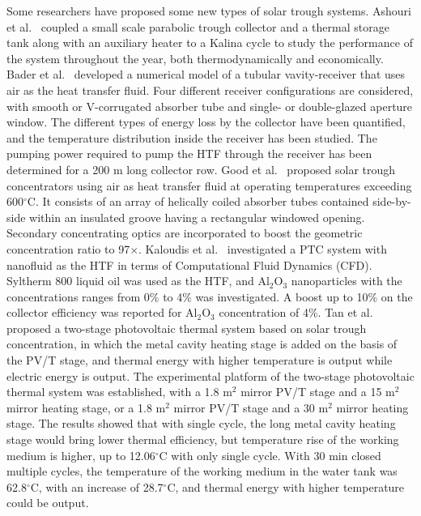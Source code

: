 Some researchers have proposed some new types of solar trough systems.
Ashouri et al.~\cite{Ashouri2015} coupled a small scale parabolic trough collector and a thermal storage tank along with an auxiliary heater to a Kalina cycle to study the performance of the system throughout the year, both thermodynamically and economically.
Bader et al.~\cite{Bader2015} developed a numerical model of a tubular vavity-receiver that uses air as the heat transfer fluid. Four different receiver configurations are considered, with smooth or V-corrugated absorber tube and single- or double-glazed aperture window. The different types of energy loss by the collector have been quantified, and the temperature distribution inside the receiver has been studied. The pumping power required to pump the HTF through the receiver has been determined for a 200 m long collector row.
Good et al.~\cite{Good2015} proposed solar trough concentrators using air as heat transfer fluid at operating temperatures exceeding 600$\mathrm{^\circ C}$. It consists of an array of helically coiled absorber tubes contained side-by-side within an insulated groove having a rectangular windowed opening. Secondary concentrating optics are incorporated to boost the geometric concentration ratio to 97$\times$.
Kaloudis et al.~\cite{Kaloudis2016} investigated a PTC system with nanofluid as the HTF in terms of Computational Fluid Dynamics (CFD). Syltherm 800 liquid oil was used as the HTF, and Al$_2$O$_3$ nanoparticles with the concentrations ranges from 0\% to 4\% was investigated. A boost up to 10\% on the collector efficiency was reported for Al$_2$O$_3$ concentration of 4\%.
Tan et al.~\cite{Tan2014} proposed a two-stage photovoltaic thermal system based on solar trough concentration, in which the metal cavity heating stage is added on the basis of the PV/T stage, and thermal energy with higher temperature is output while electric energy is output. The experimental platform of the two-stage photovoltaic thermal system was established, with a 1.8 m$^2$ mirror PV/T stage and a 15 m$^2$ mirror heating stage, or a 1.8 m$^2$ mirror PV/T stage and a 30 m$^2$ mirror heating stage. The results showed that with single cycle, the long metal cavity heating stage would bring lower thermal efficiency, but temperature rise of the working medium is higher, up to 12.06$\mathrm{^\circ C}$ with only single cycle. With 30 min closed multiple cycles, the temperature of the working medium in the water tank was 62.8$\mathrm{^\circ C}$, with an increase of 28.7$\mathrm{^\circ C}$, and thermal energy with higher temperature could be output.
